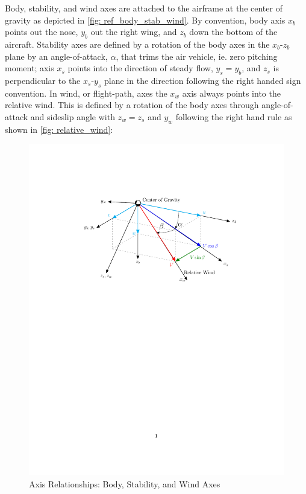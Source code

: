 \documentclass[12pt]{ucthesis}
\begin{document}
Body, stability, and wind axes are attached to the airframe at the center of gravity as depicted in \autoref{fig: ref_body_stab_wind}. By convention, body axis $x_b$ points out the nose, $y_b$ out the right wing, and $z_b$ down the bottom of the aircraft. Stability axes are defined by a rotation of the body axes in the $x_b$-$z_b$ plane by an angle-of-attack, $\alpha$, that trims the air vehicle, ie. zero pitching moment; axis $x_s$ points into the direction of steady flow, $y_s = y_b$, and $z_s$ is perpendicular to the $x_{s}$-$y_{s}$ plane in the direction following the right handed sign convention. In wind, or flight-path, axes the $x_w$ axis always points into the relative wind. This is defined by a rotation of the body axes through angle-of-attack and sideslip angle with $z_w = z_s$ and $y_w$ following the right hand rule as shown in \autoref{fig: relative_wind}:
	\begin{figure}[H]%
		\centering%
		\includegraphics[clip=true, viewport=1.75in 6.35in 7in 9.25in,scale=.8]{figs/fig_relwind.pdf} %
		\caption{Axis Relationships: Body, Stability, and Wind Axes}%
		\label{fig: relative_wind}%
	\end{figure}%
\end{document}
